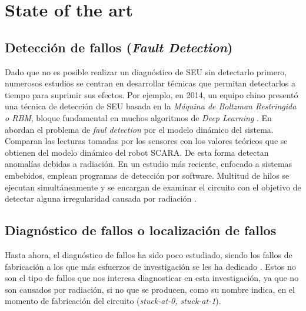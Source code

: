 \chapter{State of the art}
\label{ch:StateOfTheArt}


\section{Detección de fallos (\textit{Fault Detection})}
\label{sec:FaultDetection}
Dado que no es posible realizar
un diagnóstico de \gls{SEU} sin detectarlo primero, numerosos estudios se centran
en desarrollar técnicas que permitan detectarlos a tiempo para suprimir sus 
efectos. Por ejemplo, en 2014, un equipo chino presentó una técnica de detección 
de \gls{SEU} basada en la \textit{Máquina de Boltzman Restringida o \gls{RBM}}, 
bloque fundamental en muchos algoritmos de \textit{Deep Learning} 
\cite{RBMSEUdetection}. En \cite{SCARA} abordan el problema de \textit{faul 
detection} por el modelo dinámico del sistema. Comparan las lecturas tomadas por
los sensores con los valores teóricos que se obtienen del modelo dinámico del
robot SCARA. De esta forma detectan anomalías debidas a radiación. En un estudio
más reciente, enfocado a sistemas embebidos, emplean programas de detección por
software. Multitud de hilos se ejecutan simultáneamente y se encargan de examinar
el circuito con el objetivo de detectar alguna irregularidad causada por
radiación \cite{DetectingSEUs}.


\section{Diagnóstico de fallos o localización de fallos}
\label{sec:FaultLocation}
Hasta ahora, el diagnóstico de fallos ha sido poco estudiado, siendo los fallos de
fabricación a los que más esfuerzos de investigación se les ha dedicado
\cite{VLSI, EfficientSA0SA1, RepairSA0SA1, LargeComb, ANewRep, FILC, FDIRC}.
Estos no son el tipo de fallos que nos interesa diagnosticar en esta
investigación, ya que no son causados por radiación, si no que se producen, como
su nombre indica, en el momento de fabricación del circuito (\textit{stuck-at-0,
stuck-at-1}).


